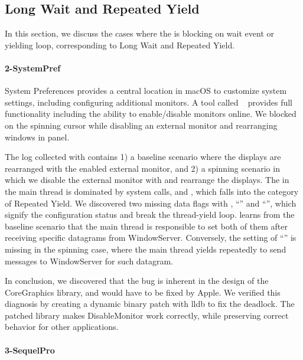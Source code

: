 \subsection{Long Wait and Repeated Yield}
In this section, we discuss the cases where the \spinningnode is blocking
on wait event or yielding loop, corresponding to Long Wait and
Repeated Yield.

\paragraph{2-SystemPref}

System Preferences provides a central location in macOS to customize
system settings, including configuring additional monitors. A tool called
~\cite{disablemonitor} provides full functionality including
the ability to enable/disable monitors online. We blocked on the spinning cursor
while disabling an external monitor and rearranging windows in 
panel.

The log collected with \xxx contains 1) a baseline scenario where the displays
are rearranged with the enabled external monitor, and 2) a spinning scenario in
which we disable the external monitor with  and rearrange
the displays. The \spinningnode in the main thread is dominated by system
calls,  and , which falls into the category of
 Repeated Yield. We discovered two missing data flags with ,
``'' and ``'', which
signify the configuration status and break the thread-yield loop. \xxx
learns from the baseline scenario that the main thread is responsible to set
both of them after receiving specific datagrams from WindowServer. Conversely,
the setting of ``'' is missing in the spinning case,
where the main thread yields repeatedly to send messages to WindowServer for
such datagram.

In conclusion, we discovered that the bug is inherent in the design of the
CoreGraphics library, and would have to be fixed by Apple. We verified this
diagnosis by creating a dynamic binary patch with lldb to fix the deadlock. The
patched library makes DisableMonitor work correctly, while preserving correct
behavior for other applications.

\paragraph{3-SequelPro}

